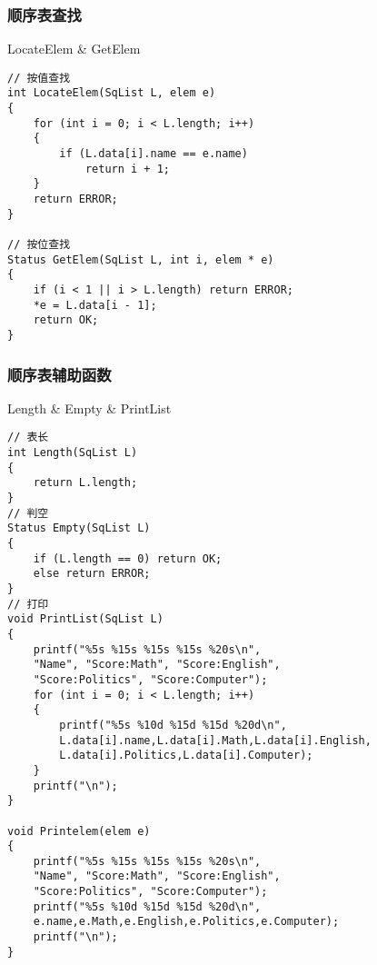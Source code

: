 \subsubsection{顺序表查找}

\begin{macbox}{LocateElem \& GetElem}
    \begin{verbatim}
// 按值查找
int LocateElem(SqList L, elem e)
{
    for (int i = 0; i < L.length; i++)
    {
        if (L.data[i].name == e.name) 
            return i + 1;
    }
    return ERROR;
}

// 按位查找
Status GetElem(SqList L, int i, elem * e)
{
    if (i < 1 || i > L.length) return ERROR;
    *e = L.data[i - 1];
    return OK;
}
    \end{verbatim}
\end{macbox}

\subsubsection{顺序表辅助函数}

\begin{macbox}{Length \& Empty \& PrintList}
    \begin{verbatim}
// 表长
int Length(SqList L)
{
    return L.length;
}
// 判空
Status Empty(SqList L)
{
    if (L.length == 0) return OK;
    else return ERROR;
}
// 打印
void PrintList(SqList L)
{
    printf("%5s %15s %15s %15s %20s\n",
    "Name", "Score:Math", "Score:English", 
    "Score:Politics", "Score:Computer");
    for (int i = 0; i < L.length; i++)
    {
        printf("%5s %10d %15d %15d %20d\n",
        L.data[i].name,L.data[i].Math,L.data[i].English,
        L.data[i].Politics,L.data[i].Computer);
    }
    printf("\n");
} 

void Printelem(elem e)
{
    printf("%5s %15s %15s %15s %20s\n",
    "Name", "Score:Math", "Score:English", 
    "Score:Politics", "Score:Computer");
    printf("%5s %10d %15d %15d %20d\n",
    e.name,e.Math,e.English,e.Politics,e.Computer);
    printf("\n");
}
    \end{verbatim}
\end{macbox}

